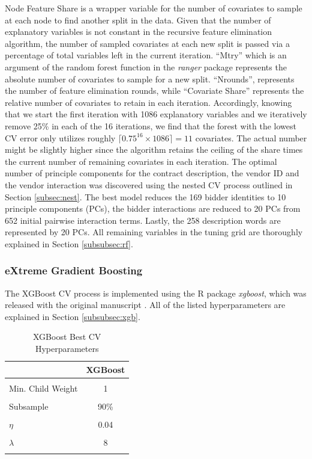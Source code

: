 \documentclass[a4paper,12pt, headsepline]{scrartcl}
\numberwithin{equation}{section}
\begin{document}
Node Feature Share is a wrapper variable for the number of covariates to sample at each node to find another split in the data. Given that the number of explanatory variables is not constant in the recursive feature elimination algorithm, the number of sampled covariates at each new split is passed via a percentage of total variables left in the current iteration. \enquote{Mtry} which is an argument of the random forest function in the \textit{ranger} package represents the absolute number of covariates to sample for a new split. \enquote{Nrounds}, represents the number of feature elimination rounds, while \enquote{Covariate Share} represents the relative number of covariates to retain in each iteration. Accordingly, knowing that we start the first iteration with 1086 explanatory variables and we iteratively remove 25\% in each of the 16 iterations, we find that the forest with the lowest CV error only utilizes roughly $\lceil 0.75^{16} \times 1086\rceil = 11$ covariates. The actual number might be slightly higher since the algorithm retains the ceiling of the share times the current number of remaining covariates in each iteration. The optimal number of principle components for the contract description, the vendor ID and the vendor interaction was discovered using the nested CV process outlined in Section \ref{subsec:nest}. The best model reduces the 169 bidder identities to 10 principle components (PCs), the bidder interactions are reduced to 20 PCs from 652 initial pairwise interaction terms. Lastly, the 258 description words are represented by 20 PCs. All remaining variables in the tuning grid are thoroughly explained in Section \ref{subsubsec:rf}.

\subsubsection{eXtreme Gradient Boosting}
The XGBoost CV process is implemented using the R package \textit{xgboost}, which was released with the original manuscript \citep{xgboost}. All of the listed hyperparameters are explained in Section \ref{subsubsec:xgb}.

\begin{table}[H]
	\centering
	\begin{tabular}[t]{lc}
		\toprule
		& XGBoost\\
		\midrule
		\cellcolor{gray!6}{$N_{iter}$} & \cellcolor{gray!6}{338}\\
		Min. Child Weight & 1\\
		\cellcolor{gray!6}{Max. Depth} & \cellcolor{gray!6}{7}\\
		Subsample & 90\%\\
		\cellcolor{gray!6}{Colsample by Tree} & \cellcolor{gray!6}{90\%}\\
		$\eta$ & 0.04\\
		\cellcolor{gray!6}{$\gamma$} & \cellcolor{gray!6}{0.01}\\
		$\lambda$ & 8\\
		\cellcolor{gray!6}{$\alpha$} & \cellcolor{gray!6}{3}\\
		\bottomrule
	\end{tabular}
	\caption{XGBoost Best CV Hyperparameters}\label{tab:xgb}
\end{table}
\end{document}
